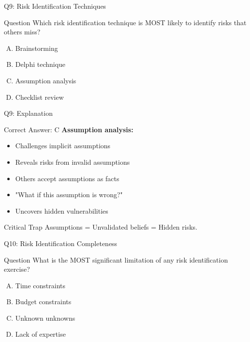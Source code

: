 \documentclass{beamer}
\begin{document}
			\begin{frame}{Q9: Risk Identification Techniques}
				\begin{block}{Question}
					Which risk identification technique is MOST likely to identify risks that others miss?
				\end{block}
				\begin{enumerate}[(A)]
					\item Brainstorming
					\item Delphi technique
					\item Assumption analysis
					\item Checklist review
				\end{enumerate}
			\end{frame}
			
			\begin{frame}{Q9: Explanation}
				\begin{block}{Correct Answer: C}
					\textbf{Assumption analysis:}
					\begin{itemize}
						\item Challenges implicit assumptions
						\item Reveals risks from invalid assumptions
						\item Others accept assumptions as facts
						\item "What if this assumption is wrong?"
						\item Uncovers hidden vulnerabilities
					\end{itemize}
				\end{block}
				\begin{alertblock}{Critical Trap}
					Assumptions = Unvalidated beliefs = Hidden risks.
				\end{alertblock}
			\end{frame}
			
			\begin{frame}{Q10: Risk Identification Completeness}
				\begin{block}{Question}
					What is the MOST significant limitation of any risk identification exercise?
				\end{block}
				\begin{enumerate}[(A)]
					\item Time constraints
					\item Budget constraints
					\item Unknown unknowns
					\item Lack of expertise
				\end{enumerate}
			\end{frame}
			
\end{document}
